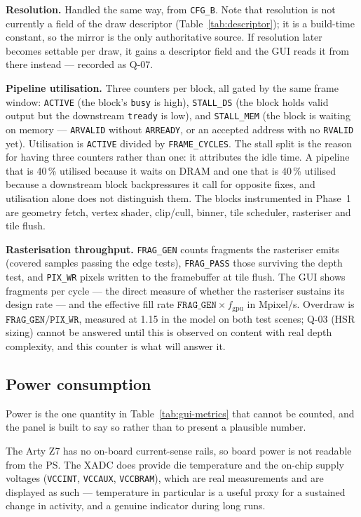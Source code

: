 \documentclass[11pt,a4paper]{article}
\newcommand{\field}[1]{\textbf{#1}\quad}
\begin{document}
\field{Resolution.} Handled the same way, from \texttt{CFG\_B}. Note that
resolution is not currently a field of the draw descriptor
(Table~\ref{tab:descriptor}); it is a build-time constant, so the mirror is the
only authoritative source. If resolution later becomes settable per draw, it
gains a descriptor field and the GUI reads it from there instead --- recorded as
Q-07.

\field{Pipeline utilisation.} Three counters per block, all gated by the same
frame window: \texttt{ACTIVE} (the block's \texttt{busy} is high),
\texttt{STALL\_DS} (the block holds valid output but the downstream
\texttt{tready} is low), and \texttt{STALL\_MEM} (the block is waiting on
memory --- \texttt{ARVALID} without \texttt{ARREADY}, or an accepted address
with no \texttt{RVALID} yet). Utilisation is \texttt{ACTIVE} divided by
\texttt{FRAME\_CYCLES}. The stall split is the reason for having three counters
rather than one: it attributes the idle time. A pipeline that is 40\,\% utilised
because it waits on DRAM and one that is 40\,\% utilised because a downstream
block backpressures it call for opposite fixes, and utilisation alone does not
distinguish them. The blocks instrumented in Phase~1 are geometry fetch, vertex
shader, clip/cull, binner, tile scheduler, rasteriser and tile flush.

\field{Rasterisation throughput.} \texttt{FRAG\_GEN} counts fragments the
rasteriser emits (covered samples passing the edge tests), \texttt{FRAG\_PASS}
those surviving the depth test, and \texttt{PIX\_WR} pixels written to the
framebuffer at tile flush. The GUI shows fragments per cycle --- the direct
measure of whether the rasteriser sustains its design rate --- and the effective
fill rate $\texttt{FRAG\_GEN}\times f_{\mathrm{gpu}}$ in Mpixel/s. Overdraw is
$\texttt{FRAG\_GEN}/\texttt{PIX\_WR}$, measured at 1.15 in the model on both
test scenes; Q-03 (HSR sizing) cannot be answered until this is observed on
content with real depth complexity, and this counter is what will answer it.

\subsection{Power consumption}
\label{sec:gui-power}

Power is the one quantity in Table~\ref{tab:gui-metrics} that cannot be counted,
and the panel is built to say so rather than to present a plausible number.

The Arty Z7 has no on-board current-sense rails, so board power is not readable
from the PS. The XADC does provide die temperature and the on-chip supply
voltages (\texttt{VCCINT}, \texttt{VCCAUX}, \texttt{VCCBRAM}), which are real
measurements and are displayed as such --- temperature in particular is a useful
proxy for a sustained change in activity, and a genuine indicator during long
runs.
\end{document}

